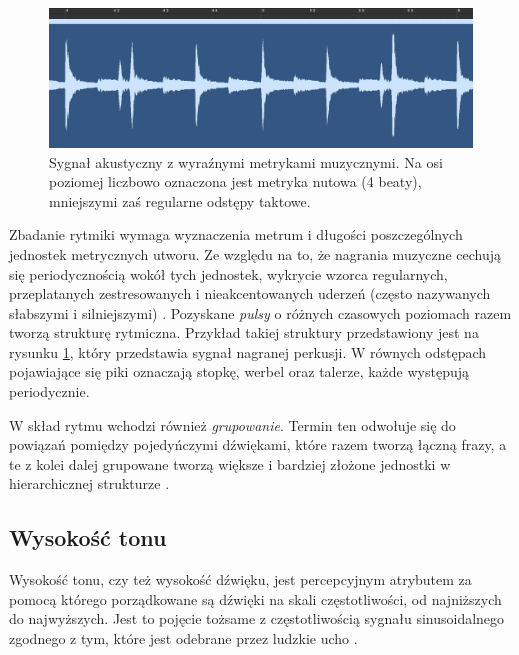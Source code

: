 \documentclass[12pt,a4paper,twoside]{mwart}
\begin{document}
\begin{figure}[H]
  \begin{center}
    \includegraphics[scale=0.3]{images/RythmMertic.jpg}
    \caption{Sygnał akustyczny z wyraźnymi metrykami muzycznymi. Na osi poziomej liczbowo oznaczona jest metryka nutowa (4 beaty), mniejszymi zaś regularne odstępy taktowe.}
    \label{fig:rythmMertic}
  \end{center}
\end{figure}

Zbadanie rytmiki wymaga wyznaczenia metrum i długości poszczególnych jednostek metrycznych utworu. Ze względu na to, że nagrania muzyczne cechują się periodycznością wokół tych jednostek, wykrycie wzorca regularnych, przeplatanych zestresowanych i nieakcentowanych uderzeń (często nazywanych słabszymi i silniejszymi) \cite[12-35]{Transcription:Lerdahl:GenerativeTheory}. Pozyskane \textit{pulsy} o różnych czasowych poziomach razem tworzą strukturę rytmiczna. Przykład takiej struktury przedstawiony jest na rysunku \ref{fig:rythmMertic}, który przedstawia sygnał nagranej perkusji. W równych odstępach pojawiające się piki oznaczają stopkę, werbel oraz talerze, każde występują periodycznie.

W skład rytmu wchodzi również \textit{grupowanie}. Termin ten odwołuje się do powiązań pomiędzy pojedyńczymi dźwiękami, które razem tworzą łączną frazy, a te z kolei dalej grupowane tworzą większe i bardziej złożone jednostki w hierarchicznej strukturze \cite[12-35]{Transcription:Lerdahl:GenerativeTheory}. 

\subsection{Wysokość tonu}\label{subsec:pitch}
Wysokość tonu, czy też wysokość dźwięku, jest percepcyjnym atrybutem za pomocą którego porządkowane są dźwięki na skali częstotliwości, od najniższych do najwyższych. Jest to pojęcie tożsame z częstotliwością sygnału sinusoidalnego zgodnego z tym, które jest odebrane przez ludzkie ucho \cite[3491-3502]{Transcription:Hartmann:PitchPeriodicityAuditoryOrganization}. 
\end{document}

